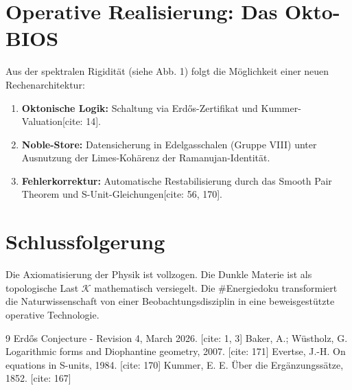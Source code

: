 \documentclass[12pt,a4paper]{article}
\begin{document}
	\section{Operative Realisierung: Das Okto-BIOS}
	Aus der spektralen Rigidität (siehe Abb. 1) folgt die Möglichkeit einer neuen Rechenarchitektur:
	\begin{enumerate}
		\item \textbf{Oktonische Logik:} Schaltung via Erdős-Zertifikat und Kummer-Valuation[cite: 14].
		\item \textbf{Noble-Store:} Datensicherung in Edelgasschalen (Gruppe VIII) unter Ausnutzung der Limes-Kohärenz der Ramanujan-Identität.
		\item \textbf{Fehlerkorrektur:} Automatische Restabilisierung durch das Smooth Pair Theorem und S-Unit-Gleichungen[cite: 56, 170].
	\end{enumerate}
	
	\section{Schlussfolgerung}
	Die Axiomatisierung der Physik ist vollzogen. Die Dunkle Materie ist als topologische Last $\mathcal{K}$ mathematisch versiegelt. Die \#Energiedoku transformiert die Naturwissenschaft von einer Beobachtungsdisziplin in eine beweisgestützte operative Technologie.
	
	\begin{thebibliography}{9}
		 Erdős Conjecture - Revision 4, March 2026. [cite: 1, 3]
		 Baker, A.; Wüstholz, G. Logarithmic forms and Diophantine geometry, 2007. [cite: 171]
		 Evertse, J.-H. On equations in S-units, 1984. [cite: 170]
		 Kummer, E. E. Über die Ergänzungssätze, 1852. [cite: 167]
	\end{thebibliography}
	
\end{document}
